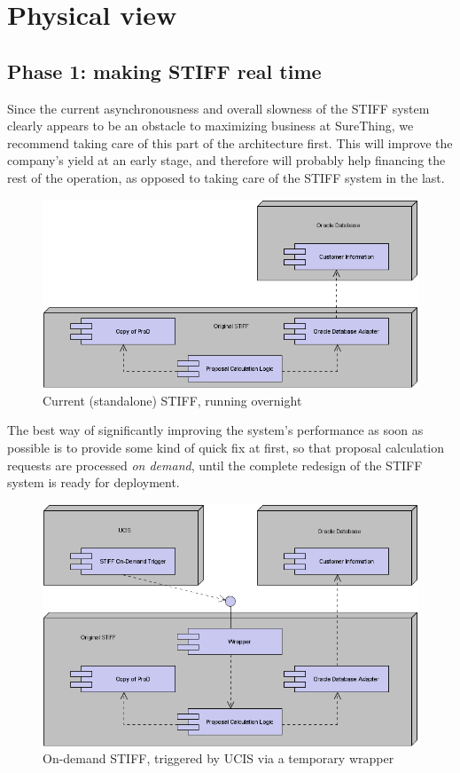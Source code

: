 \chapter{Physical view}

\section{Phase 1: making STIFF real time}

Since the current asynchronousness and overall slowness of the STIFF system
clearly appears to be an obstacle to maximizing business at SureThing, we
recommend taking care of this part of the architecture first. This will
improve the company's yield at an early stage, and therefore will probably
help financing the rest of the operation, as opposed to taking care of the
STIFF system in the last.

\begin{figure}
\includegraphics[width=\linewidth]{img/net_1_before.png}
\caption{Current (standalone) STIFF, running overnight}
\label{fig:net_1_before}
\end{figure}

The best way of significantly improving the system's performance as soon as
possible is to provide some kind of quick fix at first, so that proposal
calculation requests are processed \textit{on demand}, until the complete
redesign of the STIFF system is ready for deployment.

\begin{figure}
\includegraphics[width=\linewidth]{img/net_1_after.png}
\caption{On-demand STIFF, triggered by UCIS via a temporary wrapper}
\label{fig:net_1_after}
\end{figure}

